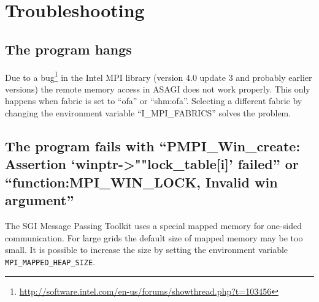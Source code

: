 \section{Troubleshooting}

\subsection{The program hangs}

Due to a bug\footnote{\url{http://software.intel.com/en-us/forums/showthread.php?t=103456}} in the Intel MPI library (version 4.0 update 3 and probably earlier versions) the remote memory access in ASAGI does not work properly. This only happens when fabric is set to ``ofa'' or ``shm:ofa''. Selecting a different fabric by changing the environment variable ``I\_MPI\_FABRICS'' solves the problem.

\subsection{The program fails with ``PMPI\_Win\_create: Assertion `winptr\mbox{-\textgreater}""lock\_table[i]' failed'' or ``function:MPI\_\-WIN\_LOCK, Invalid win argument''}

The SGI Message Passing Toolkit uses a special mapped memory for one-sided communication. For large grids the default size of mapped memory may be too small. It is possible to increase the size by setting the environment variable \texttt{MPI\_MAPPED\_HEAP\_SIZE}.